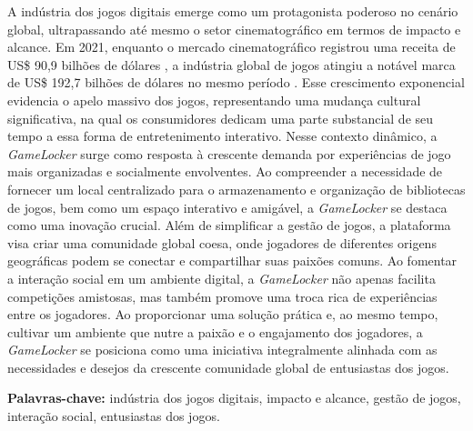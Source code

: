 \setlength{\absparsep}{18pt}
\begin{resumo} 

A indústria dos jogos digitais emerge como um protagonista poderoso no cenário global, ultrapassando até mesmo o setor cinematográfico em termos de impacto e alcance. Em 2021, enquanto o mercado cinematográfico registrou uma receita de US\$ 90,9 bilhões de dólares \cite{global_films_musics_market}, a indústria global de jogos atingiu a notável marca de US\$ 192,7 bilhões de dólares no mesmo período \cite{global_games_market}. Esse crescimento exponencial evidencia o apelo massivo dos jogos, representando uma mudança cultural significativa, na qual os consumidores dedicam uma parte substancial de seu tempo a essa forma de entretenimento interativo. Nesse contexto dinâmico, a \textit{GameLocker} surge como resposta à crescente demanda por experiências de jogo mais organizadas e socialmente envolventes. Ao compreender a necessidade de fornecer um local centralizado para o armazenamento e organização de bibliotecas de jogos, bem como um espaço interativo e amigável, a \textit{GameLocker} se destaca como uma inovação crucial. Além de simplificar a gestão de jogos, a plataforma visa criar uma comunidade global coesa, onde jogadores de diferentes origens geográficas podem se conectar e compartilhar suas paixões comuns. Ao fomentar a interação social em um ambiente digital, a \textit{GameLocker} não apenas facilita competições amistosas, mas também promove uma troca rica de experiências entre os jogadores. Ao proporcionar uma solução prática e, ao mesmo tempo, cultivar um ambiente que nutre a paixão e o engajamento dos jogadores, a \textit{GameLocker} se posiciona como uma iniciativa integralmente alinhada com as necessidades e desejos da crescente comunidade global de entusiastas dos jogos.

    \vspace{\onelineskip}

    \textbf{Palavras-chave:} indústria dos jogos digitais, impacto e alcance, gestão de jogos, interação social, entusiastas dos jogos.
    
\end{resumo}

\pagebreak